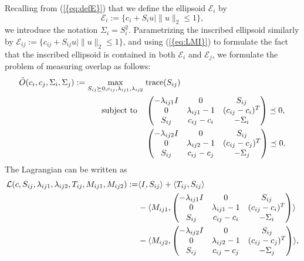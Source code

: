 \documentclass{siamltex}
\begin{document}
Recalling from {(\ref{{eq:defE}})} that we define the ellipsoid
$\mathcal{E}_i$ by
\begin{equation} \label{eq:Ei}
\mathcal{E}_i := \{ c_i + S_i u \mid \|u\|_2 \le 1 \},
\end{equation}
we introduce the notation $\Sigma_i = S_i^2$.
Parametrizing the inscribed ellipsoid similarly by $\mathcal{E}_{ij}
:= \{ c_{ij} + S_{ij} u \mid \| u \|_2 \le 1 \}$, and using
{(\ref{{eq:LMI}})} to formulate the fact that the inscribed ellipsoid is
contained in both $\mathcal{E}_i$ and $\mathcal{E}_j$, we formulate
the problem of measuring overlap as follows:
\begin{subequations}
\label{prob:lin_max_volume_ell}
\begin{align}
\hat{O} (c_i,c_j,\Sigma_i,\Sigma_j) := 
 \max_{S_{ij} \succeq 0, c_{ij}, \lambda_{ij1}, \lambda_{ij2}} \;
&{\mbox{\rm trace}} (S_{ij}) \nonumber\\
\mbox{subject to} \quad
\label{eq:sdps.1}&\begin{pmatrix} - \lambda_{ij1} I &0&S_{ij}\\0& \lambda_{ij1}-1&(c_{ij}-c_i)^T\\S_{ij} &c_{ij}-c_i&-\Sigma_i\end{pmatrix}\preceq 0, \\
\label{eq:sdps.2}& \begin{pmatrix} - \lambda_{ij2} I &0&S_{ij}\\0& \lambda_{ij2}-1&(c_{ij}-c_j)^T\\S_{ij} &c_{ij}-c_j&-\Sigma_j\end{pmatrix}\preceq 0.
\end{align}
\end{subequations}
The Lagrangian can be written as
\begin{align}
{\cal L} (c, S_{ij},\lambda_{ij1}, \lambda_{ij2}, T_{ij}, M_{ij1}, M_{ij2})  := &
 \langle I, S_{ij}\rangle + \langle T_{ij}, S_{ij} \rangle\nonumber\\ 
& - \langle M_{ij1},
\begin{pmatrix} - \lambda_{ij1} I &0&S_{ij}\\0& \lambda_{ij1}-1&(c_{ij}-c_i)^T\\S_{ij}&c_{ij}-c_i&-\Sigma_i\end{pmatrix}
\rangle \nonumber\\
& - 
\langle M_{ij2},
\begin{pmatrix} - \lambda_{ij2} I &0&S_{ij}\\0& \lambda_{ij2}-1&(c_{ij}-c_j)^T\\S_{ij}&c_{ij}-c_j&-\Sigma_j\end{pmatrix}
\rangle,
\nonumber\end{align}
\end{document}
